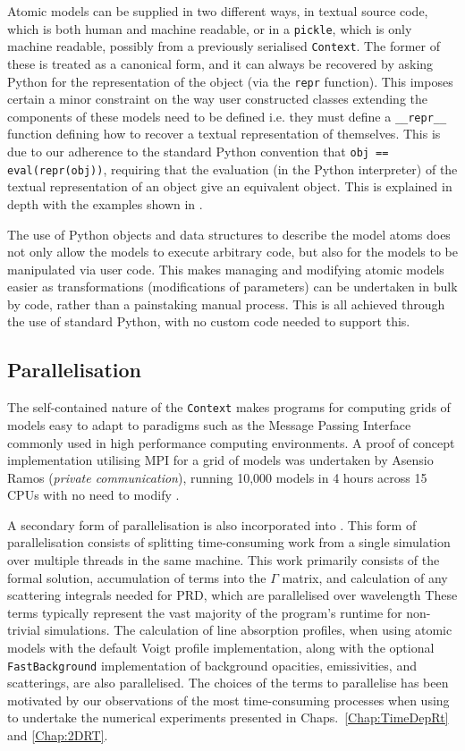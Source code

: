 Atomic models can be supplied in two different ways, in textual source code, which is both human and machine readable, or in a \texttt{pickle}, which is only machine readable, possibly from a previously serialised \texttt{Context}.
The former of these is treated as a canonical form, and it can always be recovered by asking Python for the representation of the object (via the \texttt{repr} function).
This imposes certain a minor constraint on the way user constructed classes extending the components of these models need to be defined i.e. they must define a \texttt{\_\_repr\_\_} function defining how to recover a textual representation of themselves.
This is due to our adherence to the standard Python convention that \texttt{obj == eval(repr(obj))}, requiring that the evaluation (in the Python interpreter) of the textual representation of an object give an equivalent object.
This is explained in depth with the examples shown in \citet{Osborne2021}.

The use of Python objects and data structures to describe the model atoms does not only allow the models to execute arbitrary code, but also for the models to be manipulated via user code.
This makes managing and modifying atomic models easier as transformations (modifications of parameters) can be undertaken in bulk by code, rather than a painstaking manual process.
This is all achieved through the use of standard Python, with no custom code needed to support this.

\subsection{Parallelisation}\label{Sec:LwParallelisation}

The self-contained nature of the \texttt{Context} makes \Lw{} programs for computing grids of models easy to adapt to paradigms such as the Message Passing Interface \citep[MPI, e.g.][for an overview of the MPICH implementation]{Gropp1996} commonly used in high performance computing environments.
A proof of concept implementation utilising MPI for a grid of models was undertaken by Asensio Ramos (\emph{private communication}), running 10,000 models in 4 hours across 15 CPUs with no need to modify \Lw{}.

A secondary form of parallelisation is also incorporated into \Lw{}.
This form of parallelisation consists of splitting time-consuming work from a single simulation over multiple threads in the same machine.
This work primarily consists of the formal solution, accumulation of terms into the $\Gamma$ matrix, and calculation of any scattering integrals needed for PRD, which are parallelised over wavelength
These terms typically represent the vast majority of the program's runtime for non-trivial simulations.
The calculation of line absorption profiles, when using atomic models with the default Voigt profile implementation, along with the optional \texttt{FastBackground} implementation of background opacities, emissivities, and scatterings, are also parallelised.
The choices of the terms to parallelise has been motivated by our observations of the most time-consuming processes when using \Lw{} to undertake the numerical experiments presented in Chaps.~\ref{Chap:TimeDepRt} and \ref{Chap:2DRT}.

